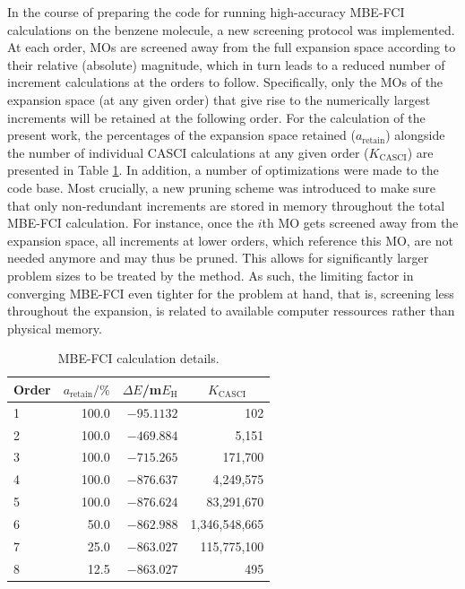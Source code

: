 \documentclass[journal=jcp,manuscript=suppinfo]{achemso}
\begin{document}
In the course of preparing the code for running high-accuracy MBE-FCI calculations on the benzene molecule, a new screening protocol was implemented. At each order, MOs are screened away from the full expansion space according to their relative (absolute) magnitude, which in turn leads to a reduced number of increment calculations at the orders to follow. Specifically, only the MOs of the expansion space (at any given order) that give rise to the numerically largest increments will be retained at the following order. For the calculation of the present work, the percentages of the expansion space retained ($a_{\text{retain}}$) alongside the number of individual CASCI calculations at any given order ($K_{\text{CASCI}}$) are presented in Table \ref{mbe_fci_SI_table}. In addition, a number of optimizations were made to the code base. Most crucially, a new pruning scheme was introduced to make sure that only non-redundant increments are stored in memory throughout the total MBE-FCI calculation. For instance, once the $i$th MO gets screened away from the expansion space, all increments at lower orders, which reference this MO, are not needed anymore and may thus be pruned. This allows for significantly larger problem sizes to be treated by the method. As such, the limiting factor in converging MBE-FCI even tighter for the problem at hand, that is, screening less throughout the expansion, is related to available computer ressources rather than physical memory.
%
\begin{table}[ht]
\begin{center}
\caption{MBE-FCI calculation details.}
\label{mbe_fci_SI_table}
\begin{tabular}{l|r|r|r}
\toprule
\multicolumn{1}{c|}{Order} & \multicolumn{1}{c|}{$a_{\text{retain}}/\%$} & \multicolumn{1}{c|}{$\Delta E$/m$E_{\text{H}}$} & \multicolumn{1}{c}{$K_{\text{CASCI}}$} \\
\midrule\midrule
1 & 100.0 & $-95.1132$ & 102 \\
2 & 100.0 & $-469.884$ & 5,151 \\
3 & 100.0 & $-715.265$ & 171,700 \\
4 & 100.0 & $-876.637$ & 4,249,575 \\
5 & 100.0 & $-876.624$ & 83,291,670 \\
6 & 50.0 & $-862.988$ & 1,346,548,665 \\
7 & 25.0 & $-863.027$ & 115,775,100 \\
8 & 12.5 & $-863.027$ & 495 \\
\midrule
\end{tabular}
\vspace{-1.4cm}
\end{center}
\end{table}
%
\end{document}
